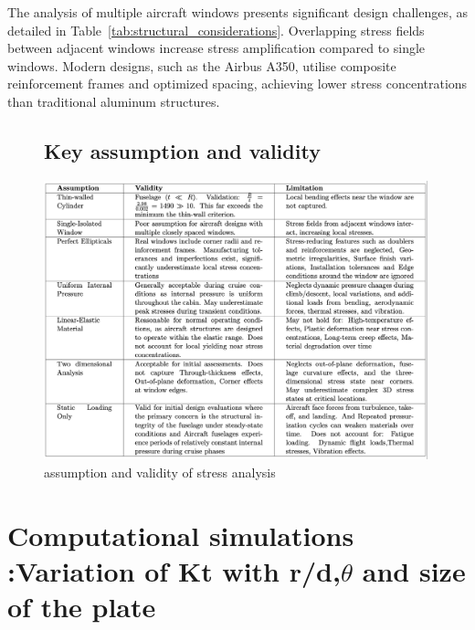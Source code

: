 \documentclass[a4paper,11pt]{article}
\begin{document}
The analysis of multiple aircraft windows presents significant design challenges, as detailed in Table~\ref{tab:structural_considerations}. Overlapping stress fields between adjacent windows increase stress amplification compared to single windows\cite{pilkey2020peterson}. Modern designs, such as the Airbus A350, utilise composite reinforcement frames and optimized spacing, achieving lower stress concentrations than traditional aluminum structures\cite{kassapoglou2013design}.  

 
\begin{figure}[H] %
 
\subsection{Key assumption and validity}\includegraphics[width=0.99\textwidth]{table1.png} %
    \caption{assumption and validity of stress analysis }


\label{tab:assumption and validity}
\end{figure} 


 
 
\vspace{-20pt} %

\section{Computational simulations :Variation of Kt with r/d,\(\theta\) and size of the plate}
\end{document}
